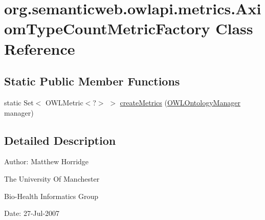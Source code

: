 \hypertarget{classorg_1_1semanticweb_1_1owlapi_1_1metrics_1_1_axiom_type_count_metric_factory}{\section{org.\-semanticweb.\-owlapi.\-metrics.\-Axiom\-Type\-Count\-Metric\-Factory Class Reference}
\label{classorg_1_1semanticweb_1_1owlapi_1_1metrics_1_1_axiom_type_count_metric_factory}
}
\subsection*{Static Public Member Functions}
\begin{DoxyCompactItemize}
\item 
static Set$<$ O\-W\-L\-Metric$<$?$>$ $>$ \hyperlink{classorg_1_1semanticweb_1_1owlapi_1_1metrics_1_1_axiom_type_count_metric_factory_a85f2492cb13fcc1b13b9daf0be9f4022}{create\-Metrics} (\hyperlink{interfaceorg_1_1semanticweb_1_1owlapi_1_1model_1_1_o_w_l_ontology_manager}{O\-W\-L\-Ontology\-Manager} manager)
\end{DoxyCompactItemize}


\subsection{Detailed Description}
Author\-: Matthew Horridge\par
 The University Of Manchester\par
 Bio-\/\-Health Informatics Group\par
 Date\-: 27-\/\-Jul-\/2007\par
\par
 

